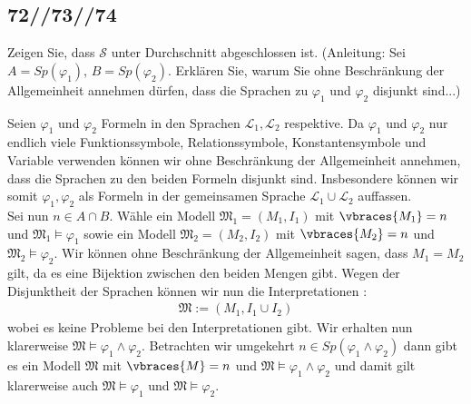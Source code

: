 \subsection*{72//73//74}

\begin{exercise}[72]

\phantom{}
	Zeigen Sie, dass $\mathscr{S}$ unter Durchschnitt abgeschlossen ist. (Anleitung: Sei $A = Sp(\varphi_1)$, $B = Sp(\varphi_2)$. Erklären Sie, warum Sie ohne Beschränkung der Allgemeinheit annehmen dürfen, dass die Sprachen zu $\varphi_1$ und $\varphi_2$ disjunkt sind...)

\end{exercise}


\begin{solution}

\phantom{}
	Seien $\varphi_1$ und $\varphi_2$ Formeln in den Sprachen $\mathcal{L}_1, \mathcal{L}_2$
	respektive.
	Da $\varphi_1$ und $\varphi_2$ nur endlich viele Funktionssymbole, Relationssymbole,
	Konstantensymbole und Variable verwenden können wir ohne Beschränkung der Allgemeinheit
	annehmen, dass die Sprachen zu den beiden Formeln disjunkt sind.\newline
	Insbesondere können wir somit $\varphi_1,\varphi_2$ als Formeln in der gemeinsamen Sprache
	$\mathcal{L}_1 \cup \mathcal{L}_2$ auffassen. \\
	Sei nun $n \in A \cap B$. Wähle ein Modell $\mathfrak{M}_1 = (M_1,I_1)$ mit
	$\vbraces{M_1} = n$ und $\mathfrak{M}_1 \vDash \varphi_1$ sowie ein Modell
	$\mathfrak{M}_2 = (M_2,I_2)$
	mit $\vbraces{M_2} = n$ und $\mathfrak{M}_2 \vDash \varphi_2$.
	Wir können ohne Beschränkung der Allgemeinheit sagen, dass $M_1 = M_2$ gilt,
	da es eine Bijektion zwischen den beiden Mengen gibt.
	Wegen der Disjunktheit der Sprachen können wir nun die Interpretationen :
	\begin{align*}
	\mathfrak{M} := (M_1,I_1 \cup I_2)
	\end{align*}
	wobei es keine Probleme bei den Interpretationen gibt. Wir erhalten nun klarerweise $\mathfrak{M} \vDash \varphi_1 \land \varphi_2$.  \newline
	Betrachten wir umgekehrt $n \in Sp(\varphi_1 \land \varphi_2)$ dann gibt es ein Modell $\mathfrak{M}$ mit $\vbraces{M} = n$ und $\mathfrak{M} \vDash \varphi_1 \land \varphi_2$ und damit gilt klarerweise auch $\mathfrak{M} \vDash \varphi_1$ und $\mathfrak{M} \vDash \varphi_2$.
\end{solution}

